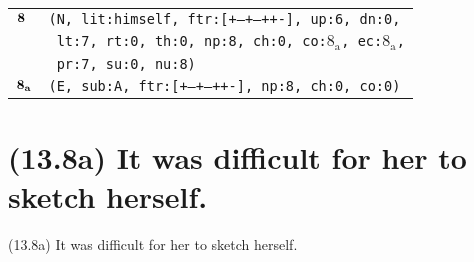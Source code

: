 \documentclass{article}
\begin{document}
\begin{minipage}{\textwidth}
{\begin{tabular}{|r|l|}
    ${\textbf{\textrm{8}}_{\phantom{z}}}$ & \texttt{\texttt{(N,~lit:himself,~ftr:[+--+--++-],~up:6,~dn:0,}} \\
    & \texttt{\texttt{~lt:7,~rt:0,~th:0,~np:8,~ch:0,~co:${\textrm{8}_{\textrm{a}}}$,~ec:${\textrm{8}_{\textrm{a}}}$,}} \\
    & \texttt{\texttt{~pr:7,~su:0,~nu:8)}} \\
    ${\textbf{\textrm{8}}_{\textbf{\textrm{a}}}}$ & \texttt{\texttt{(E,~sub:A,~ftr:[+--+--++-],~np:8,~ch:0,~co:0)}} \\
    \hline
  \end{tabular}
  }
\end{minipage}
\bigbreak

\clearpage

%
%

\section*{(13.8a) It was difficult for her to sketch herself.}

\bigbreak
\begin{enumerate*}
\item[(13.8a)] It was difficult for her to sketch herself.
\end{enumerate*}
\bigbreak
\end{document}
